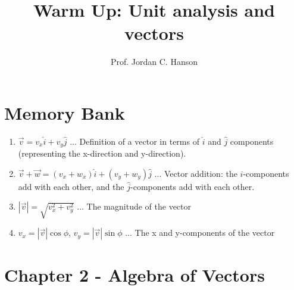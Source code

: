 \documentclass{article}
\begin{document}
\title{Warm Up: Unit analysis and vectors}
\author{Prof. Jordan C. Hanson}

\maketitle

\section{Memory Bank}

\begin{enumerate}
\item $\vec{v} = v_x \hat{i} + v_y \hat{j}$ ... Definition of a vector in terms of $\hat{i}$ and $\hat{j}$ components (representing the x-direction and y-direction).
\item $\vec{v} + \vec{w} = (v_x + w_x) \hat{i} + (v_y + w_y) \hat{j}$ ... Vector addition: the $\hat{i}$-components add with each other, and the $\hat{j}$-components add with each other.\
\item $|\vec{v}| = \sqrt{v_x^2 + v_y^2}$ ... The magnitude of the vector
\item $v_x = |\vec{v}| \cos\phi$, $v_y = |\vec{v}| \sin\phi$ ... The x and y-components of the vector
\end{enumerate}

\section{Chapter 2 - Algebra of Vectors}
\end{document}
